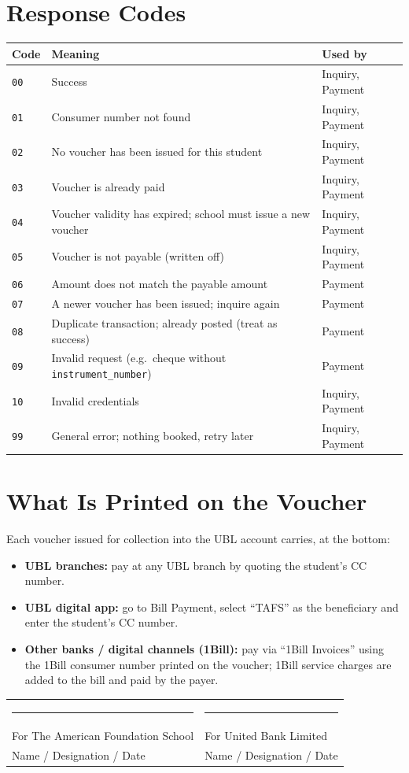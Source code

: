 \documentclass[11pt]{article}
\begin{document}
\section{Response Codes}
\begin{center}
\begin{tabularx}{\textwidth}{@{}l L l@{}}
\toprule
\textbf{Code} & \textbf{Meaning} & \textbf{Used by} \\
\midrule
\texttt{00} & Success & Inquiry, Payment \\
\texttt{01} & Consumer number not found & Inquiry, Payment \\
\texttt{02} & No voucher has been issued for this student & Inquiry, Payment \\
\texttt{03} & Voucher is already paid & Inquiry, Payment \\
\texttt{04} & Voucher validity has expired; school must issue a new voucher & Inquiry, Payment \\
\texttt{05} & Voucher is not payable (written off) & Inquiry, Payment \\
\texttt{06} & Amount does not match the payable amount & Payment \\
\texttt{07} & A newer voucher has been issued; inquire again & Payment \\
\texttt{08} & Duplicate transaction; already posted (treat as success) & Payment \\
\texttt{09} & Invalid request (e.g.\ cheque without \texttt{instrument\_number}) & Payment \\
\texttt{10} & Invalid credentials & Inquiry, Payment \\
\texttt{99} & General error; nothing booked, retry later & Inquiry, Payment \\
\bottomrule
\end{tabularx}
\end{center}

\section{What Is Printed on the Voucher}
Each voucher issued for collection into the UBL account carries, at the bottom:
\begin{itemize}[nosep]
  \item \textbf{UBL branches:} pay at any UBL branch by quoting the student's CC number.
  \item \textbf{UBL digital app:} go to Bill Payment, select ``TAFS'' as the beneficiary and enter the student's CC number.
  \item \textbf{Other banks / digital channels (1Bill):} pay via ``1Bill Invoices'' using the 1Bill consumer number printed
        on the voucher; 1Bill service charges are added to the bill and paid by the payer.
\end{itemize}

\vspace{1.5em}
\noindent\begin{tabular}{@{}p{} p{}@{}}
\rule{0.4\textwidth}{0.4pt} & \rule{0.4\textwidth}{0.4pt} \\
For The American Foundation School & For United Bank Limited \\
Name / Designation / Date & Name / Designation / Date \\
\end{tabular}
\end{document}
